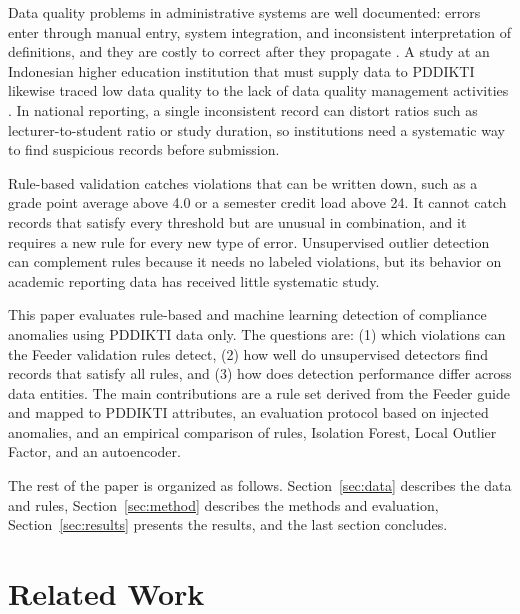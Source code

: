 \documentclass[conference]{IEEEtran}
\begin{document}
Data quality problems in administrative systems are well documented: errors enter through manual entry, system integration, and inconsistent interpretation of definitions, and they are costly to correct after they propagate \cite{whang2023dataquality,zha2025dcai}. A study at an Indonesian higher education institution that must supply data to PDDIKTI likewise traced low data quality to the lack of data quality management activities \cite{sumadi2021dq}. In national reporting, a single inconsistent record can distort ratios such as lecturer-to-student ratio or study duration, so institutions need a systematic way to find suspicious records before submission.

Rule-based validation catches violations that can be written down, such as a grade point average above 4.0 or a semester credit load above 24. It cannot catch records that satisfy every threshold but are unusual in combination, and it requires a new rule for every new type of error. Unsupervised outlier detection can complement rules because it needs no labeled violations, but its behavior on academic reporting data has received little systematic study.

This paper evaluates rule-based and machine learning detection of compliance anomalies using PDDIKTI data only. The questions are: (1) which violations can the Feeder validation rules detect, (2) how well do unsupervised detectors find records that satisfy all rules, and (3) how does detection performance differ across data entities. The main contributions are a rule set derived from the Feeder guide and mapped to PDDIKTI attributes, an evaluation protocol based on injected anomalies, and an empirical comparison of rules, Isolation Forest, Local Outlier Factor, and an autoencoder.

The rest of the paper is organized as follows. Section~\ref{sec:data} describes the data and rules, Section~\ref{sec:method} describes the methods and evaluation, Section~\ref{sec:results} presents the results, and the last section concludes.

\section{Related Work}
\end{document}
